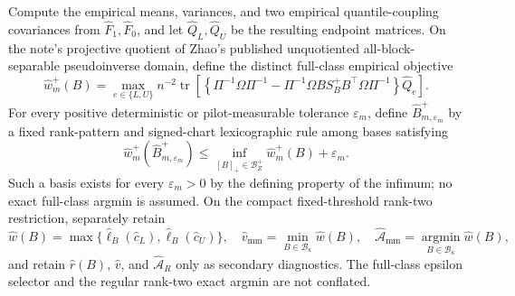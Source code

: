 Compute the empirical means, variances, and two empirical quantile-coupling covariances from \(\widehat F_1,\widehat F_0\), and let \(\widehat Q_L,\widehat Q_U\) be the resulting endpoint matrices.  On the note's projective quotient of Zhao's published unquotiented all-block-separable pseudoinverse domain, define the distinct full-class empirical objective
\[
\widehat w_m^+(B)=
\max_{e\in\{L,U\}}n^{-2}\operatorname{tr}\!\left[
\left\{\Pi^{-1}\Omega\Pi^{-1}
-\Pi^{-1}\Omega B S_B^+B^{\top}\Omega\Pi^{-1}\right\}\widehat Q_e
\right].
\]
For every positive deterministic or pilot-measurable tolerance \(\varepsilon_m\), define \(\widehat B_{m,\varepsilon_m}^+\) by a fixed rank-pattern and signed-chart lexicographic rule among bases satisfying
\[
\widehat w_m^+(\widehat B_{m,\varepsilon_m}^+)
\le
\inf_{[B]_+\in\mathcal B_Z^+}\widehat w_m^+(B)+\varepsilon_m.
\]
Such a basis exists for every \(\varepsilon_m>0\) by the defining property of the infimum; no exact full-class argmin is assumed.  On the compact fixed-threshold rank-two restriction, separately retain
\[
\widehat w(B)=\max\{\widehat\ell_B(\widehat c_L),\widehat\ell_B(\widehat c_U)\},
\quad
\widehat v_{\mathrm{mm}}=\min_{B\in\mathcal B_\kappa}\widehat w(B),
\quad
\widehat{\mathcal A}_{\mathrm{mm}}=\operatorname*{argmin}_{B\in\mathcal B_\kappa}\widehat w(B),
\]
and retain \(\widehat r(B)\), \(\widehat v\), and \(\widehat{\mathcal A}_R\) only as secondary diagnostics.  The full-class epsilon selector and the regular rank-two exact argmin are not conflated.
